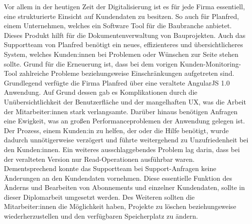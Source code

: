 Vor allem in der heutigen Zeit der Digitalisierung ist es f\"ur jede Firma essentiell, eine strukturierte Einsicht auf Kundendaten zu besitzen. So auch für Planfred, einem Unternehmen, welches ein Software Tool f\"ur die Baubranche anbietet. Dieses Produkt hilft für die Dokumentenverwaltung von Bauprojekten. Auch das Supportteam von Planfred benötigt ein neues, effizienteres und \"ubersichtlicheres System, welches Kunden:innen bei Problemen oder W\"unschen zur Seite stehen sollte. Grund für die Erneuerung ist, dass bei dem vorigen Kunden-Monitoring-Tool zahlreiche Probleme beziehungsweise Einschränkungen aufgetreten sind.
\newline
Grundlegend verf\"ugte die Firma Planfred \"uber eine veraltete AngularJS 1.0 Anwendung. Auf Grund dessen gab es Komplikationen durch die Un\"ubersichtlichkeit der Benutzerfläche und der mangelhaften UX, was die Arbeit der Mitarbeiter:innen stark verlangsamte. Dar\"uber hinaus benötigen Anfragen eine Ewigkeit, was an großen Performanceproblemen der Anwendung gelegen ist. Der Prozess, einem Kunden:in zu helfen, der oder die Hilfe benötigt, wurde dadurch unnötigerweise verzögert und f\"uhrte weitergehend zu Unzufriedenheit bei den Kunden:innen.
\newline
Ein weiteres ausschlaggebendes Problem lag darin, dass bei der veralteten Version nur Read-Operationen ausf\"uhrbar waren. Dementsprechend konnte das Supportteam bei Support-Anfragen keine Änderungen an den Kundendaten vornehmen. Diese essentielle Funktion des Änderns und Bearbeiten von Abonnements und einzelner Kundendaten, sollte in dieser Diplomarbeit umgesetzt werden. Des Weiteren sollten die Mitarbeiter:innen die Möglichkeit haben, Projekte zu löschen beziehungsweise wiederherzustellen und den verf\"ugbaren Speicherplatz zu ändern.
\newpage